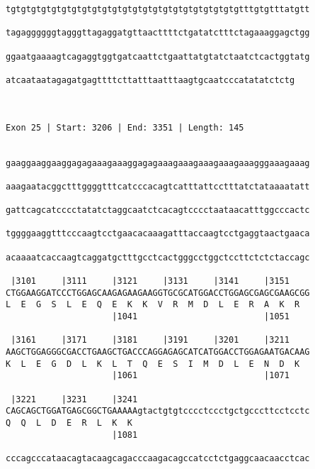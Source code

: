 \documentclass{article}
\begin{document}
\begin{Verbatim}
tgtgtgtgtgtgtgtgtgtgtgtgtgtgtgtgtgtgtgtgtgtgtgtttgtgtttatgtt
                                                            
tagaggggggtagggttagaggatgttaacttttctgatatctttctagaaaggagctgg
                                                            
ggaatgaaaagtcagaggtggtgatcaattctgaattatgtatctaatctcactggtatg
                                                            
atcaataatagagatgagttttcttatttaatttaagtgcaatcccatatatctctg
                                                         
                                                         
 
Exon 25 | Start: 3206 | End: 3351 | Length: 145


gaaggaaggaaggagagaaagaaaggagagaaagaaagaaagaaagaaagggaaagaaag
                                                            
aaagaatacggctttggggtttcatcccacagtcatttattcctttatctataaaatatt
                                                            
gattcagcatcccctatatctaggcaatctcacagtcccctaataacatttggcccactc
                                                            
tggggaaggtttcccaagtcctgaacacaaagatttaccaagtcctgaggtaactgaaca
                                                            
acaaaatcaccaagtcaggatgctttgcctcactgggcctggctccttctctctaccagc
                                                            
 |3101     |3111     |3121     |3131     |3141     |3151    
CTGGAAGGATCCCTGGAGCAAGAGAAGAAGGTGCGCATGGACCTGGAGCGAGCGAAGCGG
L  E  G  S  L  E  Q  E  K  K  V  R  M  D  L  E  R  A  K  R  
                     |1041                         |1051    
  
 |3161     |3171     |3181     |3191     |3201     |3211    
AAGCTGGAGGGCGACCTGAAGCTGACCCAGGAGAGCATCATGGACCTGGAGAATGACAAG
K  L  E  G  D  L  K  L  T  Q  E  S  I  M  D  L  E  N  D  K  
                     |1061                         |1071    
  
 |3221     |3231     |3241                                  
CAGCAGCTGGATGAGCGGCTGAAAAAgtactgtgtcccctccctgctgcccttcctcctc
Q  Q  L  D  E  R  L  K  K                                   
                     |1081                                  
  
cccagcccataacagtacaagcagacccaagacagccatcctctgaggcaacaacctcac
                                                            

\end{Verbatim}
\end{document}
